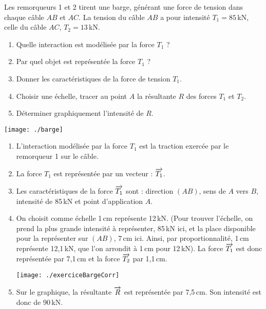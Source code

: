 \begin{exercice}
Les remorqueurs 1 et 2 tirent une barge, générant une force de tension dans chaque câble $AB$ et $AC$. La tension du câble $AB$ a pour intensité $T_1 = 85$\,kN, celle du câble $AC$, $T_2 = 13$\,kN.
\begin{enumerate}
\item Quelle interaction est modélisée par la force $T_1$ ?
\item Par quel objet est représentée la force $T_1$ ?
\item Donner les caractéristiques de la force de tension $T_1$.
\item Choisir une échelle, tracer au point $A$ la résultante $R$ des forces $T_1$ et $T_2$.
\item Déterminer graphiquement l'intensité de $R$.
\end{enumerate}
\vspace{1em}
\begin{center}
    \texttt{[image: ./barge]}   
\end{center}

\end{exercice}

\begin{corrige}
\begin{enumerate}
\item L'interaction modélisée par la force $T_1$ est la traction exercée par le remorqueur 1 sur le câble.
\item La force $T_1$ est représentée par un vecteur : $\overrightarrow{T_1}$.
\item Les caractéristiques de la force $\overrightarrow{T_1}$ sont : direction $(AB)$, sens de $A$ vers $B$, intensité de 85\,kN et point d'application $A$.
\item On choisit comme échelle 1\,cm représente 12\,kN. (Pour trouver l'échelle, on prend la plus grande intensité à représenter, 85\,kN ici, et la place disponible pour la représenter sur $(AB)$, 7\,cm ici. Ainsi, par proportionnalité, 1\,cm représente 12,1\,kN, que l'on arrondit à 1\,cm pour 12\,kN).
La force $\overrightarrow{T_1}$ est donc représentée par 7,1\,cm et la force $\overrightarrow{T_2}$ par 1,1\,cm.

\texttt{[image: ./exerciceBargeCorr]}   

\item Sur le graphique, la résultante $\overrightarrow{R}$ est représentée par 7,5\,cm. Son intensité est donc de 90\,kN.
\end{enumerate}
\end{corrige}



